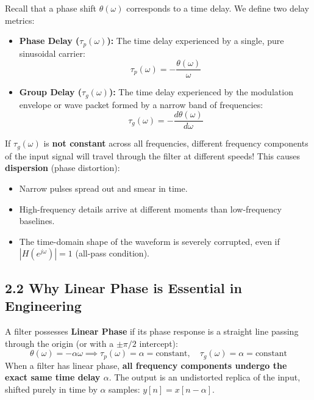 \documentclass[11pt,a4paper]{article}
\begin{document}
Recall that a phase shift $\theta(\omega)$ corresponds to a time delay. We define two delay metrics:
\begin{itemize}
    \item \textbf{Phase Delay ($\tau_p(\omega)$):} The time delay experienced by a single, pure sinusoidal carrier:
    \begin{equation}
    \tau_p(\omega) = -\frac{\theta(\omega)}{\omega}
    \end{equation}
    \item \textbf{Group Delay ($\tau_g(\omega)$):} The time delay experienced by the modulation envelope or wave packet formed by a narrow band of frequencies:
    \begin{equation}
    \tau_g(\omega) = -\frac{d\theta(\omega)}{d\omega}
    \end{equation}
\end{itemize}

If $\tau_g(\omega)$ is \textbf{not constant} across all frequencies, different frequency components of the input signal will travel through the filter at different speeds! This causes \textbf{dispersion} (phase distortion):
\begin{itemize}
    \item Narrow pulses spread out and smear in time.
    \item High-frequency details arrive at different moments than low-frequency baselines.
    \item The time-domain shape of the waveform is severely corrupted, even if $|H(e^{j\omega})| = 1$ (all-pass condition).
\end{itemize}

\subsection{2.2 Why Linear Phase is Essential in Engineering}
A filter possesses \textbf{Linear Phase} if its phase response is a straight line passing through the origin (or with a $\pm \pi/2$ intercept):
\begin{equation}
\theta(\omega) = -\alpha \omega \implies \tau_p(\omega) = \alpha = \text{constant}, \quad \tau_g(\omega) = \alpha = \text{constant}
\end{equation}
When a filter has linear phase, \textbf{all frequency components undergo the exact same time delay $\alpha$}. The output is an undistorted replica of the input, shifted purely in time by $\alpha$ samples: $y[n] = x[n - \alpha]$.
\end{document}
